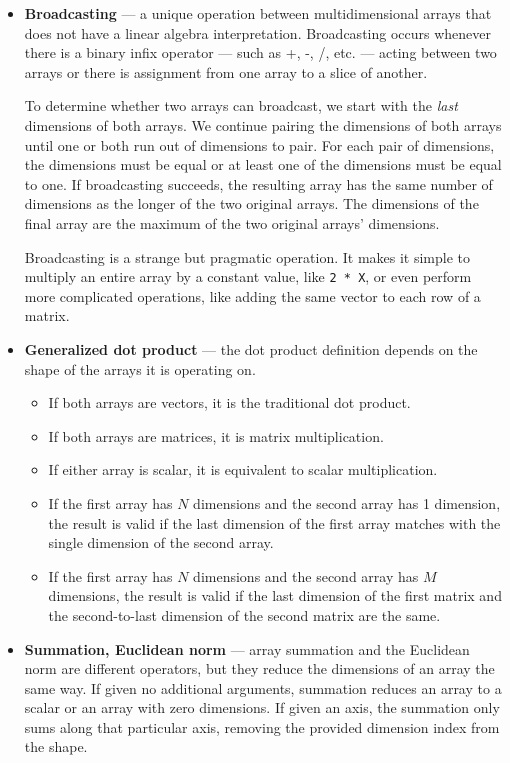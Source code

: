 \documentclass{report}
\begin{document}
\begin{itemize}
    \item \textbf{Broadcasting} --- a unique operation between multidimensional arrays that does not have a linear algebra interpretation. Broadcasting occurs whenever there is a binary infix operator --- such as +, -, /, etc. --- acting between two arrays or there is assignment from one array to a slice of another.

    To determine whether two arrays can broadcast, we start with the \textit{last} dimensions of both arrays. We continue pairing the dimensions of both arrays until one or both run out of dimensions to pair. For each pair of dimensions, the dimensions must be equal or at least one of the dimensions must be equal to one. If broadcasting succeeds, the resulting array has the same number of dimensions as the longer of the two original arrays. The dimensions of the final array are the maximum of the two original arrays' dimensions.

    Broadcasting is a strange but pragmatic operation. It makes it simple to multiply an entire array by a constant value, like \texttt{2 * X}, or even perform more complicated operations, like adding the same vector to each row of a matrix.

    \item \textbf{Generalized dot product} --- the dot product definition depends on the shape of the arrays it is operating on.
    \begin{itemize}
        \item If both arrays are vectors, it is the traditional dot product.
        \item If both arrays are matrices, it is matrix multiplication.
        \item If either array is scalar, it is equivalent to scalar multiplication.
        \item If the first array has $N$ dimensions and the second array has 1 dimension, the result is valid if the last dimension of the first array matches with the single dimension of the second array.
        \item If the first array has $N$ dimensions and the second array has $M$ dimensions, the result is valid if the last dimension of the first matrix and the second-to-last dimension of the second matrix are the same.
    \end{itemize}

    \item \textbf{Summation, Euclidean norm} --- array summation and the Euclidean norm are different operators, but they reduce the dimensions of an array the same way. If given no additional arguments, summation reduces an array to a scalar or an array with zero dimensions. If given an axis, the summation only sums along that particular axis, removing the provided dimension index from the shape.


\end{itemize}
\end{document}
